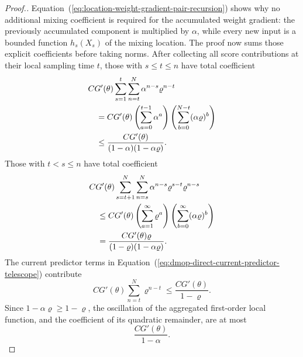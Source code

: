 \documentclass[11pt]{article}
\theoremstyle{thmstylethree}%
\begin{document}
\begin{proof}[Proof.]
Equation~(\ref{eq:location-weight-gradient-pair-recursion}) shows why no
additional mixing coefficient is required for the accumulated weight
gradient: the previously accumulated component is multiplied by
$\alpha$, while every new
input is a bounded function $h_s(X_s)$ of the mixing location.
The proof now sums those explicit coefficients before taking norms.
After collecting all score contributions at their local sampling time
$t$, those with $s\leq t\leq n$ have total coefficient
\begin{align}
&CG'(\theta)
\sum_{s=1}^{t}\sum_{n=t}^{N}
\alpha^{n-s}\varrho^{n-t}                                  \notag\\
&\quad=
CG'(\theta)
\left(\sum_{a=0}^{t-1}\alpha^a\right)
\left(\sum_{b=0}^{N-t}(\alpha\varrho)^b\right)             \notag\\
&\quad\leq
\frac{CG'(\theta)}{(1-\alpha)(1-\alpha\varrho)}.
\label{eq:dmop-direct-past-score-coefficient-sum}
\end{align}
Those with $t<s\leq n$ have total coefficient
\begin{align}
&CG'(\theta)
\sum_{s=t+1}^{N}\sum_{n=s}^{N}
\alpha^{n-s}\varrho^{s-t}\varrho^{n-s}                    \notag\\
&\quad\leq
CG'(\theta)
\left(\sum_{a=1}^{\infty}\varrho^a\right)
\left(\sum_{b=0}^{\infty}(\alpha\varrho)^b\right)          \notag\\
&\quad=
\frac{CG'(\theta)\varrho}
{(1-\varrho)(1-\alpha\varrho)}.
\label{eq:dmop-direct-future-score-coefficient-sum}
\end{align}
The current predictor terms in
Equation~(\ref{eq:dmop-direct-current-predictor-telescope}) contribute
\begin{equation}
CG'(\theta)\sum_{n=t}^{N}\varrho^{n-t}
\leq\frac{CG'(\theta)}{1-\varrho}.
\label{eq:dmop-direct-current-predictor-coefficient-sum}
\end{equation}
Since $1-\alpha\varrho\geq1-\varrho$, the oscillation of the
aggregated first-order local function, and the coefficient of its
quadratic remainder, are at most
\begin{equation}
\frac{CG'(\theta)}{1-\alpha}.
\label{eq:dmop-direct-aggregated-local-oscillation}
\end{equation}


\end{proof}
\end{document}
